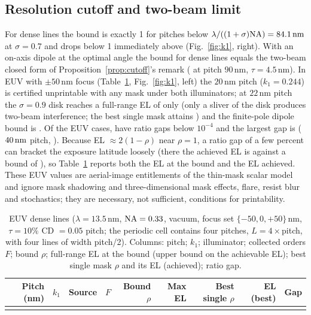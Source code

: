\documentclass[11pt,a4paper]{article}
\newcommand{\SI}[2]{\ensuremath{#1\,\mathrm{#2}}}\newcommand{\SIrange}[3]{\ensuremath{#1\text{--}#2\,\mathrm{#3}}}
\theoremstyle{remark}\newtheorem*{remark}{Remark}
\begin{document}
\subsection{Resolution cutoff and two-beam limit}
For dense lines the bound is exactly 1 for pitches below $\lambda/((1+\sigma)\NA)=\SI{84.1}{nm}$ at $\sigma=0.7$ and drops below 1 immediately above (Fig.~\ref{fig:k1}, right). With an on-axis dipole at the optimal angle the bound for dense lines equals the two-beam closed form of Proposition~\ref{prop:cutoff}'s remark (\denseDipoleBound{} at pitch \SI{90}{nm}, $\tau=\SI{4.5}{nm}$). In EUV with $\pm\SI{50}{nm}$ focus (Table~\ref{tab:euv}, Fig.~\ref{fig:k1}, left) the \SI{20}{nm} pitch ($k_1=0.244$) is certified unprintable with any mask under both illuminators; at \SI{22}{nm} pitch the $\sigma=0.9$ disk reaches a full-range EL of only \euvTwentyTwoConvEL{} (only a sliver of the disk produces two-beam interference; the best single mask attains \euvTwentyTwoConvELBest{}) and the finite-pole dipole bound is \euvTwentyTwoDipBound{}. Of the \euvN{} EUV cases, \euvTightN{} have ratio gaps below $10^{-4}$ and the largest gap is \euvMaxGap{} (\SI{\euvLoosePitch}{nm} pitch, \euvLooseSrc). Because EL $\approx2(1-\rho)$ near $\rho=1$, a ratio gap of a few percent can bracket the exposure latitude loosely (there the achieved EL is \euvLooseELBest{} against a bound of \euvLooseELBound), so Table~\ref{tab:euv} reports both the EL at the bound and the EL achieved. These EUV values are aerial-image entitlements of the thin-mask scalar model and ignore mask shadowing and three-dimensional mask effects, flare, resist blur and stochastics; they are necessary, not sufficient, conditions for printability.
\begin{table}[tbp]\centering\small
\caption{EUV dense lines ($\lambda=\SI{13.5}{nm}$, $\mathrm{NA}=0.33$, vacuum, focus set $\{-50,0,+50\}\,\mathrm{nm}$, $\tau=10\%$ CD $=0.05$ pitch; the periodic cell contains four pitches, $L=4\times$pitch, with four lines of width pitch/2). Columns: pitch; $k_1$; illuminator; collected orders $F$; bound $\rho$; full-range EL at the bound (upper bound on the achievable EL); best single mask $\rho$ and its EL (achieved); ratio gap.}\label{tab:euv}
\begin{tabular}{@{}rrlrrrrrr@{}}\toprule
Pitch (nm) & $k_1$ & Source & $F$ & Bound $\rho$ & Max EL & Best single $\rho$ & EL (best) & Gap\\\midrule
\\
\bottomrule\end{tabular}\end{table}
\end{document}
